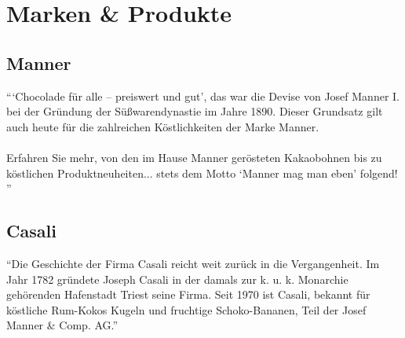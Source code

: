\section{Marken \& Produkte}
\subsection{Manner}
\enquote{\enquote{Chocolade für alle – preiswert und gut}, das war die Devise von Josef Manner I. bei der Gründung der Süßwarendynastie im Jahre 1890. Dieser Grundsatz gilt auch heute für die zahlreichen Köstlichkeiten der Marke Manner.\\\\
Erfahren Sie mehr, von den im Hause Manner gerösteten Kakaobohnen bis zu köstlichen Produktneuheiten... stets dem Motto \enquote{Manner mag man eben} folgend!
}\cite{josef_manner_marken}

\subsection{Casali}
\enquote{Die Geschichte der Firma Casali reicht weit zurück in die Vergangenheit. Im Jahr 1782 gründete Joseph Casali in der damals zur k. u. k. Monarchie gehörenden Hafenstadt Triest seine Firma. Seit 1970 ist Casali, bekannt für köstliche Rum-Kokos Kugeln und fruchtige Schoko-Bananen, Teil der Josef Manner \& Comp. AG.}\cite{josef_manner_marken}

